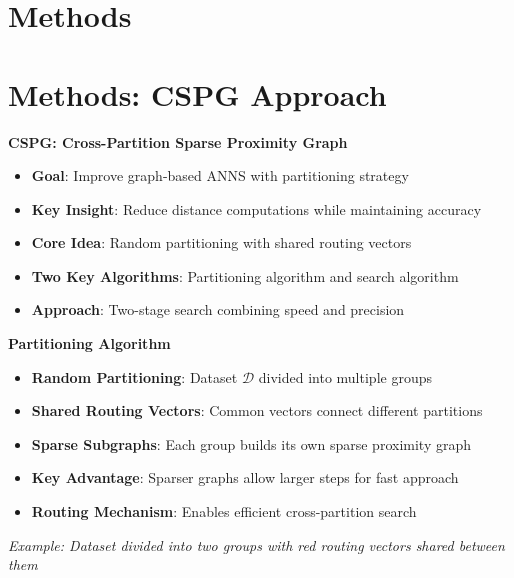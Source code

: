 \section{Methods}%
\section{Methods: CSPG Approach}%
\begin{frame}
\begin{center}
\LARGE\textbf{CSPG: Cross-Partition Sparse Proximity Graph}
\end{center}

\vspace{0.5cm}

\begin{itemize}
    \item \textbf{Goal}: Improve graph-based ANNS with partitioning strategy
    \item \textbf{Key Insight}: Reduce distance computations while maintaining accuracy
    \item \textbf{Core Idea}: Random partitioning with shared routing vectors
    \item \textbf{Two Key Algorithms}: Partitioning algorithm and search algorithm
    \item \textbf{Approach}: Two-stage search combining speed and precision
\end{itemize}
\end{frame}%
\begin{frame}
\begin{center}
\Large\textbf{Partitioning Algorithm}
\end{center}

\vspace{0.3cm}

\begin{itemize}
    \item \textbf{Random Partitioning}: Dataset $\mathcal{D}$ divided into multiple groups
    \item \textbf{Shared Routing Vectors}: Common vectors connect different partitions
    \item \textbf{Sparse Subgraphs}: Each group builds its own sparse proximity graph
    \item \textbf{Key Advantage}: Sparser graphs allow larger steps for fast approach
    \item \textbf{Routing Mechanism}: Enables efficient cross-partition search
\end{itemize}

\vspace{0.3cm}
\textit{Example: Dataset divided into two groups with red routing vectors shared between them}
\end{frame}%
